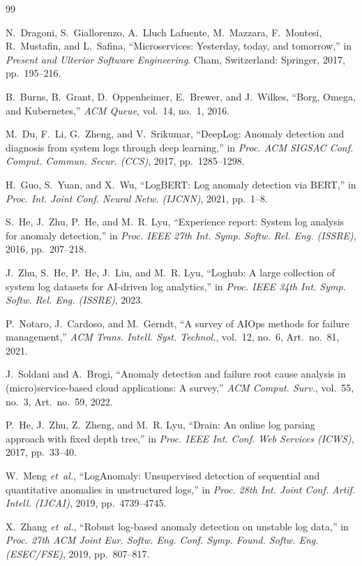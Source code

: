 \documentclass[journal]{IEEEtran}
\begin{document}
\balance
\begin{thebibliography}{99}

N.~Dragoni, S.~Giallorenzo, A.~Lluch Lafuente, M.~Mazzara, F.~Montesi, R.~Mustafin, and L.~Safina, ``Microservices: Yesterday, today, and tomorrow,'' in \emph{Present and Ulterior Software Engineering}. Cham, Switzerland: Springer, 2017, pp.~195--216.

B.~Burns, B.~Grant, D.~Oppenheimer, E.~Brewer, and J.~Wilkes, ``Borg, Omega, and Kubernetes,'' \emph{ACM Queue}, vol.~14, no.~1, 2016.

M.~Du, F.~Li, G.~Zheng, and V.~Srikumar, ``DeepLog: Anomaly detection and diagnosis from system logs through deep learning,'' in \emph{Proc. ACM SIGSAC Conf. Comput. Commun. Secur. (CCS)}, 2017, pp.~1285--1298.

H.~Guo, S.~Yuan, and X.~Wu, ``LogBERT: Log anomaly detection via BERT,'' in \emph{Proc. Int. Joint Conf. Neural Netw. (IJCNN)}, 2021, pp.~1--8.

S.~He, J.~Zhu, P.~He, and M.~R. Lyu, ``Experience report: System log analysis for anomaly detection,'' in \emph{Proc. IEEE 27th Int. Symp. Softw. Rel. Eng. (ISSRE)}, 2016, pp.~207--218.

J.~Zhu, S.~He, P.~He, J.~Liu, and M.~R. Lyu, ``Loghub: A large collection of system log datasets for AI-driven log analytics,'' in \emph{Proc. IEEE 34th Int. Symp. Softw. Rel. Eng. (ISSRE)}, 2023.

P.~Notaro, J.~Cardoso, and M.~Gerndt, ``A survey of AIOps methods for failure management,'' \emph{ACM Trans. Intell. Syst. Technol.}, vol.~12, no.~6, Art.~no.~81, 2021.

J.~Soldani and A.~Brogi, ``Anomaly detection and failure root cause analysis in (micro)service-based cloud applications: A survey,'' \emph{ACM Comput. Surv.}, vol.~55, no.~3, Art.~no.~59, 2022.

P.~He, J.~Zhu, Z.~Zheng, and M.~R. Lyu, ``Drain: An online log parsing approach with fixed depth tree,'' in \emph{Proc. IEEE Int. Conf. Web Services (ICWS)}, 2017, pp.~33--40.

W.~Meng \emph{et~al.}, ``LogAnomaly: Unsupervised detection of sequential and quantitative anomalies in unstructured logs,'' in \emph{Proc. 28th Int. Joint Conf. Artif. Intell. (IJCAI)}, 2019, pp.~4739--4745.

X.~Zhang \emph{et~al.}, ``Robust log-based anomaly detection on unstable log data,'' in \emph{Proc. 27th ACM Joint Eur. Softw. Eng. Conf. Symp. Found. Softw. Eng. (ESEC/FSE)}, 2019, pp.~807--817.


\end{thebibliography}
\end{document}

